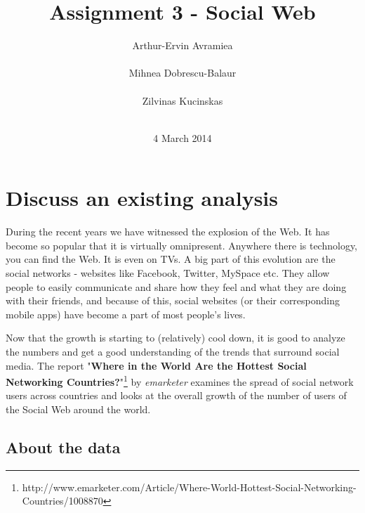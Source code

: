 \documentclass{acm_proc_10ptArticle-sp}
\begin{document}
\title{Assignment 3 - Social Web}

\author{
%
\alignauthor Arthur-Ervin Avramiea\\
       \\
\alignauthor Mihnea Dobrescu-Balaur\\
	\\
\alignauthor Zilvinas Kucinskas\\
	\\
}

\date{4 March 2014}
\maketitle

\section{Discuss an existing analysis}


During the recent years we have witnessed the explosion of the Web. It has become so popular that it is virtually omnipresent. Anywhere there is technology, you can find the Web. It is even on TVs. A big part of this evolution are the social networks - websites like Facebook, Twitter, MySpace etc. They allow people to easily communicate and share how they feel and what they are doing with their friends, and because of this, social websites (or their corresponding mobile apps) have become a part of most people's lives.

Now that the growth is starting to (relatively) cool down, it is good to analyze the numbers and get a good understanding of the trends that surround social media. The report "\textbf{Where in the World Are the Hottest Social Networking Countries?}"\footnote{http://www.emarketer.com/Article/Where-World-Hottest-Social-Networking-Countries/1008870} by \textit{emarketer} examines the spread of social network users across countries and looks at the overall growth of the number of users of the Social Web around the world.     

\subsection{About the data} 
\end{document}
